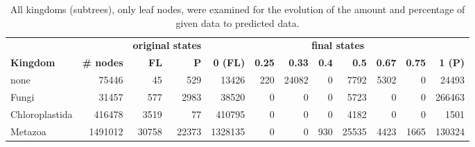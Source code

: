       \begin{table}[h!]
        \begin{center}
          \hspace*{-2cm}\begin{tabular}{ |l|r||r|r||r|r|r|r|r|r|r|r| }
            \hline
            & & \multicolumn{2}{c||}{\bfseries original states} & \multicolumn{8}{c|}{\bfseries final states} \\
            \bfseries Kingdom & \bfseries \# nodes & \bfseries FL & \bfseries P
              & \bfseries 0 (FL) & \bfseries 0.25 & \bfseries 0.33 & \bfseries 0.4 & \bfseries 0.5 & \bfseries 0.67 & \bfseries 0.75 & \bfseries 1 (P) \\
            \hline \hline
            none & 75446 & 45 & 529 
              & 13426 & 220 & 24082 & 0 & 7792 & 5302 & 0 & 24493 \\
            Fungi & 31457 & 577 & 2983
              & 38520 & 0 & 0 & 0 & 5723 & 0 & 0 & 266463 \\
            Chloroplastida & 416478 & 3519 & 77
              & 410795 & 0 & 0 & 0 & 4182 & 0 & 0 & 1501 \\
            Metazoa & 1491012 & 30758 & 22373
              & 1328135 & 0 & 0 & 930 & 25535 & 4423 & 1665 & 130324 \\
            \hline  
          \end{tabular}
        \end{center}
        \caption{All kingdoms (subtrees), only leaf nodes, were examined for the evolution of the 
          amount and percentage of given data to predicted data.}
        \label{table:Kingdom leaf nodes}
      \end{table}


